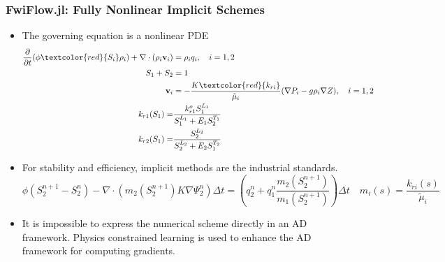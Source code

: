 \documentclass{beamer}
\begin{document}
\begin{frame}
\frametitle{FwiFlow.jl: Fully Nonlinear Implicit Schemes}
\begin{itemize}
	\item The governing equation is a nonlinear PDE
{\scriptsize
	\begin{align*}
	\frac{\partial }{{\partial t}}(\phi {\textcolor{red}{S_i}}{\rho _i}) + \nabla  \cdot ({\rho _i}{\mathbf{v}_i}) &= {\rho _i}{q_i},\quad 
      i = 1,2	\\
      S_{1} + S_{2} &= 1\\
      {\mathbf{v}_i} &= - \frac{{K{\textcolor{red}{k_{ri}}}}}{{{\tilde{\mu}_i}}}(\nabla {P_i} - g{\rho _i}\nabla Z), \quad
      i=1, 2\\
	k_{r1}(S_1) =& \frac{k_{r1}^o S_1^{L_1}}{S_1^{L_1} + E_1 S_2^{T_1}}\\
	k_{r2}(S_1) =& \frac{ S_2^{L_2}}{S_2^{L_2} + E_2 S_1^{T_2}}
	\end{align*}
	}
	\item For stability and efficiency, implicit methods are the industrial standards. 
{\scriptsize	$$\phi (S_2^{n + 1} - S_2^n) - \nabla \cdot \left( {{m_{2}}(S_2^{n + 1})K\nabla \Psi _2^n} \right) \Delta t = 
\left(q_2^n + q_1^n \frac{m_2(S^{n+1}_2)}{m_1(S^{n+1}_2)}\right) 
\Delta t\quad m_i(s) = \frac{k_{ri}(s)}{\tilde \mu_i}
$$}
\item It is impossible to express the numerical scheme directly in an AD framework. Physics constrained learning is used to enhance the AD framework for computing gradients. 
\end{itemize}

\end{frame}
\end{document}
